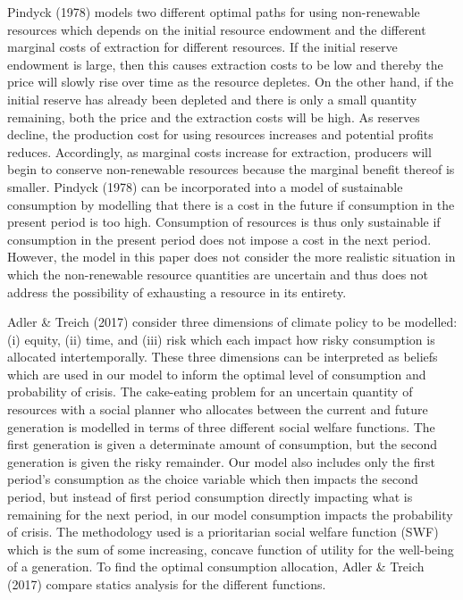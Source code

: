 \documentclass[11pt,preprint, authoryear]{elsarticle}
\numberwithin{equation}{section}
\numberwithin{figure}{section}
\numberwithin{table}{section}
\begin{document}
Pindyck (1978) models two different optimal paths for using
non-renewable resources which depends on the initial resource endowment
and the different marginal costs of extraction for different resources.
If the initial reserve endowment is large, then this causes extraction
costs to be low and thereby the price will slowly rise over time as the
resource depletes. On the other hand, if the initial reserve has already
been depleted and there is only a small quantity remaining, both the
price and the extraction costs will be high. As reserves decline, the
production cost for using resources increases and potential profits
reduces. Accordingly, as marginal costs increase for extraction,
producers will begin to conserve non-renewable resources because the
marginal benefit thereof is smaller. Pindyck (1978) can be incorporated
into a model of sustainable consumption by modelling that there is a
cost in the future if consumption in the present period is too high.
Consumption of resources is thus only sustainable if consumption in the
present period does not impose a cost in the next period. However, the
model in this paper does not consider the more realistic situation in
which the non-renewable resource quantities are uncertain and thus does
not address the possibility of exhausting a resource in its entirety.

Adler \& Treich (2017) consider three dimensions of climate policy to be
modelled: (i) equity, (ii) time, and (iii) risk which each impact how
risky consumption is allocated intertemporally. These three dimensions
can be interpreted as beliefs which are used in our model to inform the
optimal level of consumption and probability of crisis. The cake-eating
problem for an uncertain quantity of resources with a social planner who
allocates between the current and future generation is modelled in terms
of three different social welfare functions. The first generation is
given a determinate amount of consumption, but the second generation is
given the risky remainder. Our model also includes only the first
period's consumption as the choice variable which then impacts the
second period, but instead of first period consumption directly
impacting what is remaining for the next period, in our model
consumption impacts the probability of crisis. The methodology used is a
prioritarian social welfare function (SWF) which is the sum of some
increasing, concave function of utility for the well-being of a
generation. To find the optimal consumption allocation, Adler \& Treich
(2017) compare statics analysis for the different functions.
\end{document}
